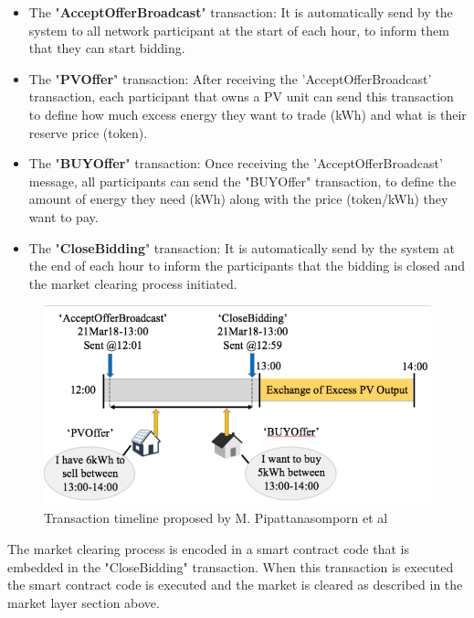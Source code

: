 \begin{itemize}
    \item The "\textbf{AcceptOfferBroadcast}" transaction: It is automatically send by the system to
          all network participant at the start of each hour, to inform them that they can start bidding.
    \item The "\textbf{PVOffer}" transaction: After receiving the 'AcceptOfferBroadcast' transaction,
          each participant that owns a PV unit can send this transaction to define how much excess energy they
          want to trade (kWh) and what is their reserve price (token).
    \item The "\textbf{BUYOffer}" transaction: Once receiving the 'AcceptOfferBroadcast' message, all
          participants can send the "BUYOffer" transaction, to define the amount of energy they need (kWh) along
          with the price (token/kWh) they want to pay.
    \item The "\textbf{CloseBidding}" transaction: It is automatically send by the system at the end
          of each hour to inform the participants that the bidding is closed and the market clearing process
          initiated.
\end{itemize}
\begin{figure}[h!]
    \centering
    \includegraphics[scale=0.4]{Figures/transaction_timeline.png}
    \caption{Transaction timeline proposed by M. Pipattanasomporn et al \cite{Pipattanasomporn2013}}
\end{figure}
The market clearing process is encoded in a smart contract code that is embedded in the "CloseBidding"
transaction. When this transaction is executed the smart contract code is executed and the market is
cleared as described in the market layer section above.
\cite{Pipattanasomporn2013}

